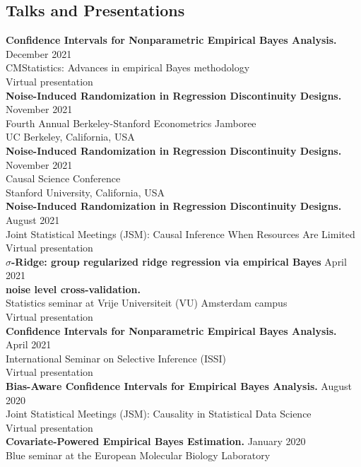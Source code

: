 \documentclass[margin,line]{res}
\begin{document}
\begin{resume}
\section{\sc Talks and Presentations}
\textbf{Confidence Intervals for Nonparametric Empirical Bayes Analysis.} \hfill December 2021\\
CMStatistics: Advances in empirical Bayes methodology\\
Virtual presentation\\
\textbf{Noise-Induced Randomization in Regression Discontinuity Designs.}  \hfill November 2021\\
Fourth Annual Berkeley-Stanford Econometrics Jamboree\\
UC Berkeley, California, USA \\
\textbf{Noise-Induced Randomization in Regression Discontinuity Designs.}  \hfill November 2021\\
Causal Science Conference\\
Stanford University, California, USA\\
\textbf{Noise-Induced Randomization in Regression Discontinuity Designs.} \hfill August 2021\\
Joint Statistical Meetings (JSM): Causal Inference When Resources Are Limited\\
Virtual presentation\\
\textbf{$\sigma$-Ridge: group regularized ridge regression via empirical Bayes} \hfill April 2021\\
 \textbf{noise level cross-validation.}\\
Statistics seminar at Vrije Universiteit (VU) Amsterdam campus\\
Virtual presentation\\
\textbf{Confidence Intervals for Nonparametric Empirical Bayes Analysis.} \hfill April 2021\\
International Seminar on Selective Inference (ISSI)\\
Virtual presentation\\
\textbf{Bias-Aware Confidence Intervals for Empirical Bayes Analysis.} \hfill August 2020\\
Joint Statistical Meetings (JSM): Causality in Statistical Data Science\\
Virtual presentation\\
\textbf{Covariate-Powered Empirical Bayes Estimation.} \hfill January 2020\\
Blue seminar at the European Molecular Biology Laboratory\\

\end{resume}
\end{document}
